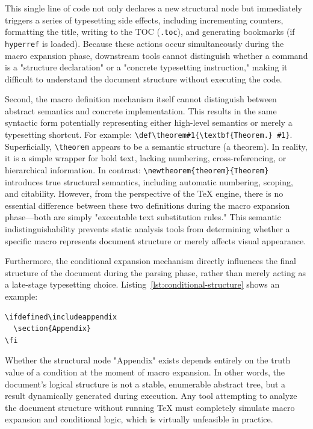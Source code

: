 This single line of code not only declares a new structural node but immediately triggers a series of typesetting side effects, including incrementing counters, formatting the title, writing to the TOC (\texttt{.toc}), and generating bookmarks (if \texttt{hyperref} is loaded). Because these actions occur simultaneously during the macro expansion phase, downstream tools cannot distinguish whether a command is a "structure declaration" or a "concrete typesetting instruction," making it difficult to understand the document structure without executing the code.

Second, the macro definition mechanism itself cannot distinguish between abstract semantics and concrete implementation. This results in the same syntactic form potentially representing either high-level semantics or merely a typesetting shortcut. For example: \texttt{\textbackslash def\textbackslash theorem\#1\{\textbackslash textbf\{Theorem.\} \#1\}}. Superficially, \texttt{\textbackslash theorem} appears to be a semantic structure (a theorem). In reality, it is a simple wrapper for bold text, lacking numbering, cross-referencing, or hierarchical information. In contrast: \texttt{\textbackslash newtheorem\{theorem\}\{Theorem\}} introduces true structural semantics, including automatic numbering, scoping, and citability. However, from the perspective of the \TeX{} engine, there is no essential difference between these two definitions during the macro expansion phase---both are simply "executable text substitution rules." This semantic indistinguishability prevents static analysis tools from determining whether a specific macro represents document structure or merely affects visual appearance.

Furthermore, the conditional expansion mechanism directly influences the final structure of the document during the parsing phase, rather than merely acting as a late-stage typesetting choice. Listing~\ref{lst:conditional-structure} shows an example:

\begin{lstlisting}[caption={Conditional structure},label={lst:conditional-structure}]
\ifdefined\includeappendix
  \section{Appendix}
\fi
\end{lstlisting}

Whether the structural node "Appendix" exists depends entirely on the truth value of a condition at the moment of macro expansion. In other words, the document's logical structure is not a stable, enumerable abstract tree, but a result dynamically generated during execution. Any tool attempting to analyze the document structure without running \TeX{} must completely simulate macro expansion and conditional logic, which is virtually unfeasible in practice.

